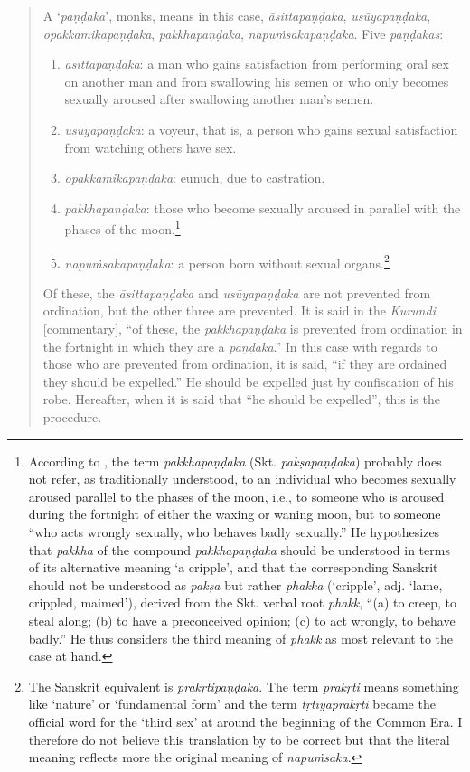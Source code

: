 \begin{quote}
A `\textit{paṇḍaka}', monks, means in this case, \textit{āsittapaṇḍaka}, \textit{usūyapaṇḍaka}, \textit{opakkamikapaṇḍaka}, \textit{pakkhapaṇḍaka}, \textit{napuṁsakapaṇḍaka}. Five \textit{paṇḍakas}:

\begin{enumerate}
\item \textit{āsittapaṇḍaka}: a man who gains satisfaction from performing oral sex on another man and from swallowing his semen or who only becomes sexually aroused after swallowing another man's semen. 
\item \textit{usūyapaṇḍaka}: a voyeur, that is, a person who gains sexual satisfaction from watching others have sex. 
\item \textit{opakkamikapaṇḍaka}: eunuch, due to castration.
\item \textit{pakkhapaṇḍaka}: those who become sexually aroused in parallel with the phases of the moon.\footnote{According to \cite{bomhard}, the term \textit{pakkhapaṇḍaka} (Skt. \textit{pakṣapaṇḍaka}) probably does not refer, as traditionally understood, to an individual who becomes sexually aroused parallel to the phases of the moon, i.e., to someone who is aroused during the fortnight of either the waxing or waning moon, but to someone ``who acts wrongly sexually, who behaves badly sexually.'' He hypothesizes that \textit{pakkha} of the compound \textit{pakkhapaṇḍaka} should be understood in terms of its alternative meaning `a cripple', and that the corresponding Sanskrit should not be understood as \textit{pakṣa} but rather \textit{phakka} (`cripple', adj. `lame, crippled, maimed'), derived from the Skt. verbal root \textit{phakk}, ``(a) to creep, to steal along; (b) to have a preconceived opinion; (c) to act wrongly, to behave badly.'' He thus considers the third meaning of \textit{phakk} as most relevant to the case at hand.}
\item \textit{napuṁsakapaṇḍaka}: a person born without sexual organs.\footnote{The Sanskrit equivalent is \textit{prakṛtipaṇḍaka}. The term \textit{prakṛti} means something like `nature' or `fundamental form' and the term \textit{tṛtīyāprakṛti} became the official word for the `third sex' at around the beginning of the Common Era. I therefore do not believe this translation by \cite{thanissaro} to be correct but that the literal meaning reflects more the original meaning of \textit{napuṁsaka}.} 
\end{enumerate}

Of these, the \textit{āsittapaṇḍaka} and \textit{usūyapaṇḍaka} are not prevented from ordination, but the other three are prevented. It is said in the \textit{Kurundi} [commentary], ``of these, the \textit{pakkhapaṇḍaka} is prevented from ordination in the fortnight in which they are a \textit{paṇḍaka}.'' In this case with regards to those who are prevented from ordination, it is said, ``if they are ordained they should be expelled.'' He should be expelled just by confiscation of his robe. Hereafter, when it is said that ``he should be expelled'', this is the procedure.
\end{quote}

